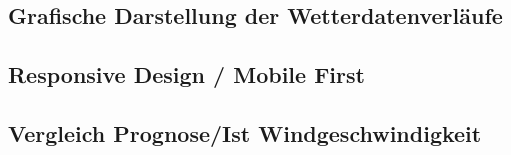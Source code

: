 



\subsection{Grafische Darstellung der Wetterdatenverläufe}




\subsection{Responsive Design / Mobile First}


\subsection{Vergleich Prognose/Ist Windgeschwindigkeit}


